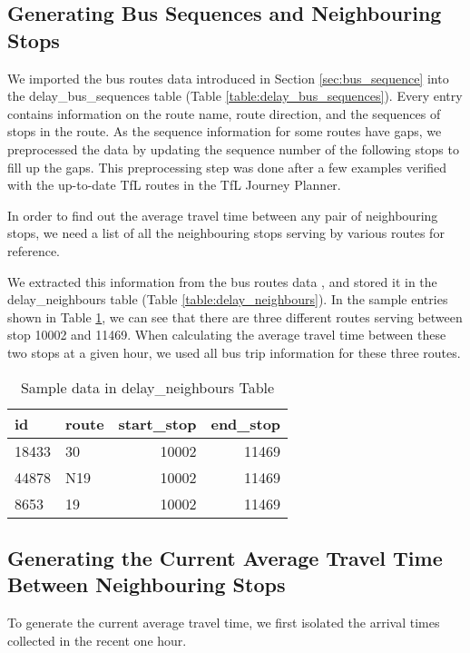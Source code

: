 \subsection{Generating Bus Sequences and Neighbouring Stops}
\label{sec:bus_stop_locations_routes}
\par We imported the bus routes data introduced in Section \ref{sec:bus_sequence} into the delay\_bus\_sequences table (Table \ref{table:delay_bus_sequences}). Every entry contains information on the route name, route direction, and the sequences of stops in the route. As the sequence information for some routes have gaps, we preprocessed the data by updating the sequence number of the following stops to fill up the gaps. This preprocessing step was done after a few examples verified with the up-to-date TfL routes in the TfL Journey Planner.

\par In order to find out the average travel time between any pair of neighbouring stops, we need a list of all the neighbouring stops serving by various routes for reference.

\par We extracted this information from the bus routes data , and stored it in the delay\_neighbours table (Table \ref{table:delay_neighbours}). In the sample entries shown in Table \ref{table:sample_neighbours_view}, we can see that there are three different routes serving between stop 10002 and 11469. When calculating the average travel time between these two stops at a given hour, we used all bus trip information for these three routes.

\begin{table}
\centering
\begin{tabular}{@{}llrr@{}} \toprule
id & route & start\_stop & end\_stop \\ \midrule
18433 & 30 & 10002 & 11469 \\
44878 & N19 & 10002 & 11469 \\
8653 & 19 & 10002 & 11469 \\ \bottomrule
\end{tabular}
\caption{Sample data in delay\_neighbours Table}
\label{table:sample_neighbours_view}
\end{table}

\subsection{Generating the Current Average Travel Time Between Neighbouring Stops}
\par To generate the current average travel time, we first isolated the arrival times collected in the recent one hour.


